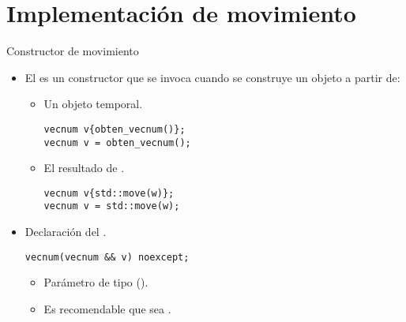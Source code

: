 \section{Implementación de movimiento}

\begin{frame}[t,fragile]{Constructor de movimiento}
\begin{itemize}
  \item El  es un constructor que se invoca
        cuando se construye un objeto a partir de:
    \begin{itemize}
      \item Un objeto temporal.
\begin{lstlisting}
vecnum v{obten_vecnum()};
vecnum v = obten_vecnum();
\end{lstlisting}
      \item El resultado de .
\begin{lstlisting}
vecnum v{std::move(w)};
vecnum v = std::move(w);
\end{lstlisting}
    \end{itemize}

  \item Declaración del .
\begin{lstlisting}
vecnum(vecnum && v) noexcept;
\end{lstlisting}
    \begin{itemize}
      \item Parámetro de tipo  (\cppkey{\&\&}).
      \item Es recomendable que sea .
    \end{itemize}
\end{itemize}
\end{frame}

